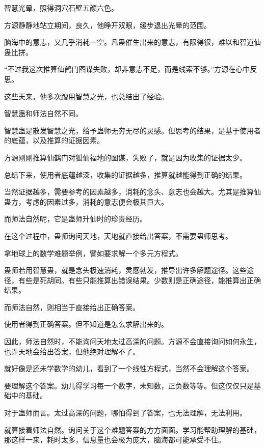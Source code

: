 
\begin{this_body}



智慧光晕，照得洞穴石壁五颜六色。

方源静静地站立期间，良久，他睁开双眼，缓步退出光晕的范围。

脑海中的意志，又几乎消耗一空。凡蛊催生出来的意志，有限得很，难以和智道仙蛊比拼。

“不过我这次推算仙鹤门图谋失败，却非意志不足，而是线索不够。”方源在心中反思。

这些天来，他多次蹭用智慧之光，也总结出了经验。

智慧蛊和师法自然不同。

智慧蛊是散发智慧之光，给予蛊师无穷无尽的灵感。但思考的结果，是基于使用者的底蕴，以及推算的证据因素。

方源刚刚推算仙鹤门对狐仙福地的图谋，失败了，就是因为收集的证据太少。

总结下来，使用者底蕴越深，收集的证据越多，推算就越能得到正确的结果。

当然证据越多，需要参考的因素越多，消耗的念头、意志也会越大。尤其是推算仙蛊方，考虑的因素过多，消耗的意志便会极其巨大。

而师法自然呢，它是蛊师升仙时的珍贵经历。

在这个过程中，蛊师询问天地，天地就直接给出答案，不需要蛊师思考。

拿地球上的数学难题举例，譬如要求解一个多元方程式。

蛊师若用智慧蛊，就是念头极速消耗，灵感勃发，推导出许多解题途径。这些途径，有些是死胡同。有些只能推算出错误结果。少数则是正确途径，能推算出正确结果。

而师法自然，则相当于直接给出正确答案。

使用者得到正确答案。但不知道是怎么求解出来的。

因此，师法自然时，不能询问天地太过高深的问题。方源不会直接询问如何永生，也许天地会给出答案，但他绝对理解不了。

就好像是还未学数学的幼儿，看到了一个线性方程式，当然不会理解这个答案。

要理解这个答案。幼儿得学习每一个数字，未知数，正负数等等。但这仅仅只是基础中的基础。

对于蛊师而言。太过高深的问题，哪怕得到了答案，也无法理解，无法利用。

就算接着师法自然。询问关于这个难题答案的方方面面。学习能帮助理解的基础，那这样一来，耗时太多，信息量也会极为庞大，脑海都可能承受不住。


\end{this_body}
